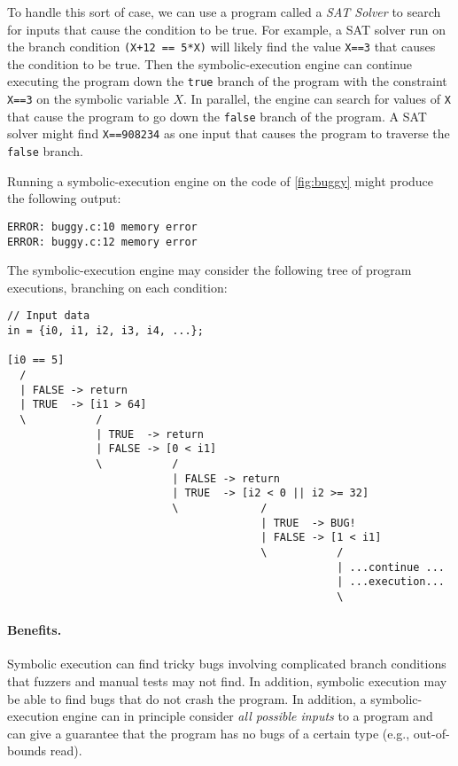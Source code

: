 To handle this sort of case, we can use a program called
a \emph{SAT Solver} to search for inputs that cause the condition
to be true.
For example, a SAT solver run on the branch condition 
\verb|(X+12 == 5*X)| will likely find the value \verb|X==3|
that causes the condition to be true.
Then the symbolic-execution engine can continue executing
the program down the \verb|true| branch of the program
with the constraint \verb|X==3| on the symbolic variable $X$.
In parallel, the engine can search for values of \verb|X|
that cause the program to go down the \verb|false| branch
of the program.
A SAT solver might find \verb|X==908234| as one input
that causes the program to traverse the \verb|false| branch.

Running a symbolic-execution engine on the code of \cref{fig:buggy}
might produce the following output:
\begin{verbatim}
ERROR: buggy.c:10 memory error 
ERROR: buggy.c:12 memory error 
\end{verbatim}

The symbolic-execution engine may consider the following tree 
of program executions, branching on each condition:
\begin{verbatim}
// Input data
in = {i0, i1, i2, i3, i4, ...};

[i0 == 5]
  /
  | FALSE -> return
  | TRUE  -> [i1 > 64]
  \           /
              | TRUE  -> return
              | FALSE -> [0 < i1]
              \           /
                          | FALSE -> return
                          | TRUE  -> [i2 < 0 || i2 >= 32]
                          \             /
                                        | TRUE  -> BUG!
                                        | FALSE -> [1 < i1]
                                        \           /
                                                    | ...continue ...
                                                    | ...execution...
                                                    \
\end{verbatim}

\paragraph{Benefits.}
Symbolic execution can find tricky bugs involving complicated
branch conditions that fuzzers and manual tests may not find.
In addition, symbolic execution may be able to find bugs
that do not crash the program.
In addition, a symbolic-execution engine can in principle
consider \emph{all possible inputs} to a program and can 
give a guarantee that the program has no bugs of a certain
type (e.g., out-of-bounds read).

